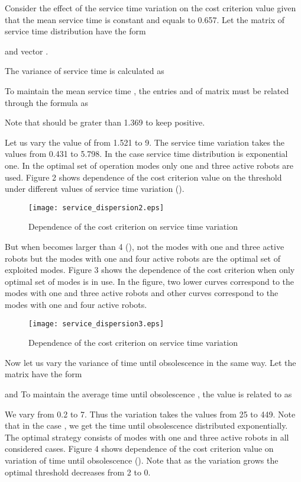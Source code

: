 \documentclass[11pt]{article}
\begin{document}
Consider the effect of the service time variation on the cost
criterion value given that the mean service time  is constant
and equals to 0.657. Let the matrix  of service time distribution
have the form

and vector .

The variance of service time is calculated as

To maintain the mean service time , the entries  and
 of matrix  must be related through the formula
 as

Note that  should be grater than 1.369 to keep 
positive.

Let us vary the value of  from 1.521 to 9. The service
time variation  takes the values from 0.431 to 5.798. In the
case  service time distribution is exponential one.
In the optimal set of operation modes only one and three active
robots are used. Figure 2 shows dependence of the cost criterion
value on the threshold under different values of service time
variation ().

\begin{figure}[htb]
\centering \texttt{[image: service\_dispersion2.eps]}\\
  \caption{Dependence of the cost criterion on service time variation}
\end{figure}

But when  becomes larger than 4 (), not the
modes with one and three active robots  but the modes with one and
four active robots are the optimal set of exploited modes. Figure 3
shows the dependence of the cost criterion when only optimal set of
modes is in use. In the figure, two lower curves correspond to the
modes with one and three active robots and other curves correspond
to the modes with one and four active robots.

\begin{figure}[htb]
\centering \texttt{[image: service\_dispersion3.eps]}\\
  \caption{Dependence of the cost criterion on service time variation}
\end{figure}

Now let us vary the variance of time until obsolescence in the same
way. Let the matrix  have the form

and  To maintain the average time until
obsolescence , the value  is related to 
as

We vary  from 0.2 to 7. Thus the variation takes the
values from 25 to 449. Note that in the case , we get
the time until obsolescence distributed exponentially. The optimal
strategy consists of modes with one and three active robots in all
considered cases. Figure 4 shows dependence of the cost criterion
value on variation of time until obsolescence (). Note that as the variation grows the optimal
threshold decreases from 2 to 0.
\end{document}
